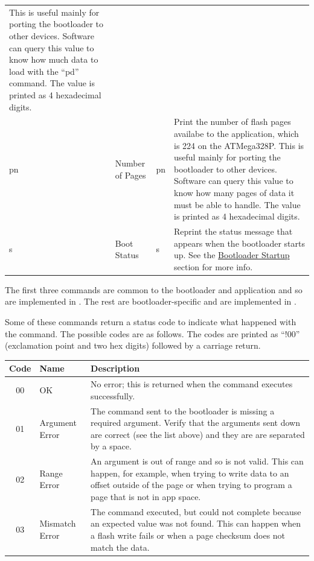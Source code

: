 \documentclass{article}
\begin{document}
\begin{longtable}{l|l|p{}|p{}}
    This is useful mainly for porting the bootloader to other devices.  Software can query this
    value to know how much data to load with the ``pd'' command.  The value is printed as 4
    hexadecimal digits.  \\
    pn & Number of Pages & pn & Print the number of flash pages availabe to the application,
    which is 224 on the ATMega328P.  This is useful mainly for porting the bootloader to other
    devices.  Software can query this value to know how many pages of data it must be able to
    handle.  The value is printed as 4 hexadecimal digits. \\
    s & Boot Status & s & Reprint the status message that appears when the bootloader starts
    up.  See the \hyperref[sssec:FWBootStartup]{Bootloader Startup} section for more info. \\
\end{longtable}

The first three commands are common to the bootloader and application and so are implemented in
.  The rest are bootloader-specific and are implemented in
.

Some of these commands return a status code to indicate what happened with the command.  The
possible codes are as follows.  The codes are printed as ``!00'' (exclamation point and two hex
digits) followed by a carriage return.

\label{tab:FWBootErrors}
\begin{center}
    \begin{tabular}{c|l|p{}}
        Code & Name & Description \\
        \hline
        00 & OK & No error; this is returned when the command executes successfully. \\
        01 & Argument Error & The command sent to the bootloader is missing a required argument.
        Verify that the arguments sent down are correct (see the list above) and they are are
        separated by a space. \\
        02 & Range Error & An argument is out of range and so is not valid.  This can happen, for
        example, when trying to write data to an offset outside of the page or when trying to
        program a page that is not in app space. \\
        03 & Mismatch Error & The command executed, but could not complete because an expected value
        was not found.  This can happen when a flash write fails or when a page checksum does not
        match the data. \\
    \end{tabular}
\end{center}
\end{document}
